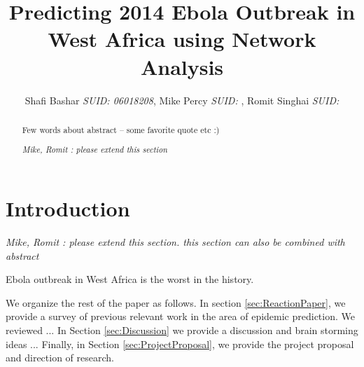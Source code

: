 \documentclass[12pt, journal,onecolumn]{IEEEtran}
\begin{document}
\title{Predicting 2014 Ebola Outbreak in West Africa using Network Analysis}
\author{Shafi Bashar {\em SUID: 06018208}, Mike Percy {\em  SUID: }, Romit  Singhai {\em  SUID: }
}
\maketitle

\begin{abstract}
Few words about abstract -- some favorite quote etc :)

\em{Mike, Romit : please extend this section}
\end{abstract}



\section{Introduction}
\label{sec:introduction}
{\em{Mike, Romit : please extend this section. this section can also be combined with abstract}}

\bigskip
{} Ebola outbreak in West Africa is the worst in the history. 




We organize the rest of the paper as follows. In section \ref{sec:ReactionPaper}, we provide a survey of previous relevant work in the area of epidemic prediction. We reviewed ...
In Section \ref{sec:Discussion} we provide a discussion and brain storming ideas ...
Finally, in Section \ref{sec:ProjectProposal}, we provide the project proposal and direction of research.
\end{document}
